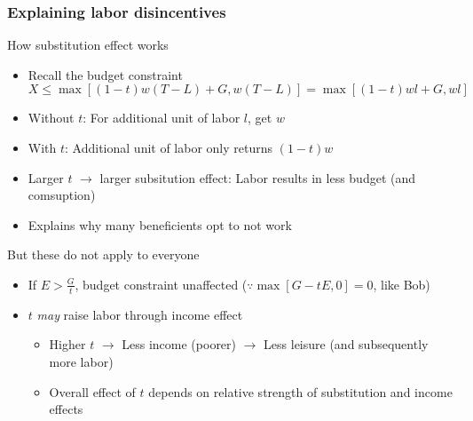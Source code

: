 \documentclass[aspectratio=169]{beamer}
\begin{document}
\begin{frame}
\frametitle{Explaining labor disincentives}
How substitution effect works
\begin{itemize}\setlength\itemsep{3pt}
\item Recall the budget constraint
\[
   X\leq \max[(1-t)w(T-L)+G,w(T-L)]=\max[(1-t)wl+G,wl]
   \]\vspace{-20pt}
\item Without $t$: For additional unit of labor $l$, get $w$ 
\item With $t$: Additional unit of labor only returns $(1-t)w$
\item Larger $t$ $\to$ larger subsitution effect: Labor results in less budget (and comsuption)
\item Explains why many beneficients opt to not work
\end{itemize} \medskip
But these do not apply to everyone
\begin{itemize}\setlength\itemsep{3pt}
\item If $E>\frac{G}{t}$, budget constraint unaffected ($\because \max[G-tE,0]=0$, like Bob) 
\item $t$ \textit{may} raise labor through income effect
\begin{itemize}\setlength\itemsep{3pt}
\item Higher $t$ $\to$ Less income (poorer) $\to$ Less leisure (and subsequently more labor)
\item Overall effect of $t$ depends on relative strength of substitution and income effects
\end{itemize}
\end{itemize}
\end{frame}
\end{document}
